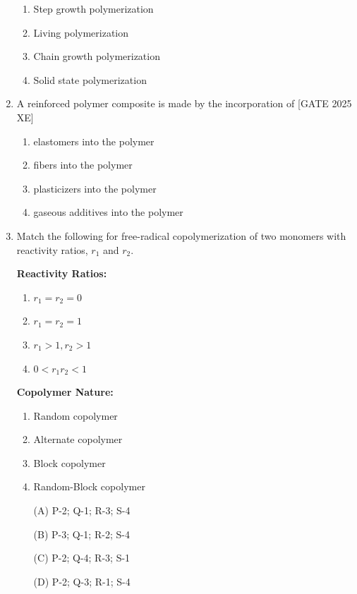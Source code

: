 \documentclass[journal,12pt,onecolumn]{IEEEtran}
\theoremstyle{remark}
\begin{document}
\begin{enumerate}
\begin{multicols}{2}
\begin{enumerate}
\item Step growth polymerization
\item Living polymerization
\item Chain growth polymerization
\item Solid state polymerization
\end{enumerate}
\end{multicols}

\item A reinforced polymer composite is made by the incorporation of \hfill[GATE 2025 XE]

\begin{multicols}{2}
\begin{enumerate}
\item elastomers into the polymer
\item fibers into the polymer
\item plasticizers into the polymer
\item gaseous additives into the polymer
\end{enumerate}
\end{multicols}

   \item Match the following for free-radical copolymerization of two monomers with reactivity ratios, $r_1$ and $r_2$.

\begin{multicols}{2}
\textbf{Reactivity Ratios:}
\begin{enumerate}
    \item $r_1 = r_2 = 0$
    \item $r_1 = r_2 = 1$
    \item $r_1 > 1, r_2 > 1$
    \item $0 < r_1 r_2 < 1$
\end{enumerate}

\textbf{Copolymer Nature:}
\begin{enumerate}
    \item Random copolymer
    \item Alternate copolymer
    \item Block copolymer
    \item Random-Block copolymer
\end{enumerate}
\end{multicols}

\begin{multicols}{2}
\begin{enumerate}
    \item[(A)] P-2; Q-1; R-3; S-4
    \item[(B)] P-3; Q-1; R-2; S-4
    \item[(C)] P-2; Q-4; R-3; S-1
    \item[(D)] P-2; Q-3; R-1; S-4
\end{enumerate}
\end{multicols}


\end{enumerate}
\end{document}
